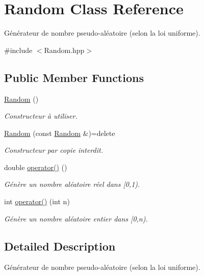 \hypertarget{classRandom}{\section{Random Class Reference}
\label{classRandom}
}


Générateur de nombre pseudo-\/aléatoire (selon la loi uniforme).  




{\ttfamily \#include $<$Random.\+hpp$>$}

\subsection*{Public Member Functions}
\begin{DoxyCompactItemize}
\item 
\hyperlink{classRandom_acb76b49c3903a3c4fb67fd216341f08d}{Random} ()
\begin{DoxyCompactList}\small\item\em Constructeur à utiliser. \end{DoxyCompactList}\item 
\hyperlink{classRandom_a9bfadeaa4adc5ac44142d000b1c99441}{Random} (const \hyperlink{classRandom}{Random} \&)=delete
\begin{DoxyCompactList}\small\item\em Constructeur par copie interdit. \end{DoxyCompactList}\item 
double \hyperlink{classRandom_aa0277ecffaf7d920b8ebd2399214f113}{operator()} ()
\begin{DoxyCompactList}\small\item\em Génère un nombre aléatoire réel dans \mbox{[}0,1). \end{DoxyCompactList}\item 
int \hyperlink{classRandom_a20265a86364664d85253931dc4685fa3}{operator()} (int n)
\begin{DoxyCompactList}\small\item\em Génère un nombre aléatoire entier dans \mbox{[}0,n). \end{DoxyCompactList}\end{DoxyCompactItemize}


\subsection{Detailed Description}
Générateur de nombre pseudo-\/aléatoire (selon la loi uniforme). 


